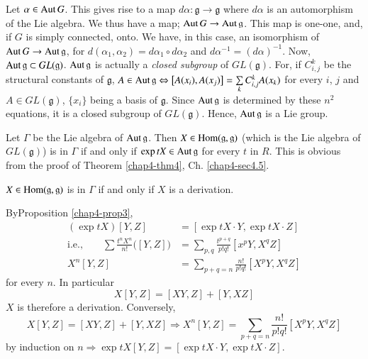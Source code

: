 Let $\alpha \in \operatorname{Aut} G$. This gives rise to a map $d \alpha:
\mathfrak{g} \rightarrow  \mathfrak{g}$ where $d \alpha$ is an
automorphism of the Lie algebra.  We thus have a map;  
 $\operatorname{Aut} G \rightarrow \operatorname{Aut} \mathfrak{g}$.  This map is one-one, and, if $G$
 is simply connected, onto. We have, in this case, an isomorphism of
 $\operatorname{Aut} G \rightarrow \operatorname{Aut} \mathfrak{g}$, for $d(\alpha_1, \alpha_2)=
 d \alpha _1 \circ d \alpha _2$ and  $d \alpha^{-1}
 =(d\alpha)^{-1}$. Now, $\operatorname{Aut}  \mathfrak{g}  \subset GL(\mathfrak{g}
 )$. $\operatorname{Aut}  \mathfrak{g}$  is actually a \textit{closed subgroup} of
 $GL(\mathfrak{g})$.  For, if $C^{k}_{i,j}$ be the structural
 constants of  $\mathfrak{g}$, 
 $A \in \operatorname{Aut} \mathfrak{g} \Leftrightarrow \big[A(x_i),
   A(x_j)\big] = \sum\limits_{k}  C^{k}_{i,j}A(x_k)$  for    every
 $i$, $j$ and $A \in GL(\mathfrak{g})$, $\{x_i\}$  being a basis of 
$\mathfrak{g}$. Since $\operatorname{Aut} \mathfrak{g}$ is determined  by these 
$n^2$ equations, it  is a closed subgroup of $GL( \mathfrak{g})$.
Hence, $\operatorname{Aut}  \mathfrak{g}$  is a Lie group. 

\begin{proposition}\label{chap4-prop3}%
 Let $ \Gamma$ be the Lie algebra of $\operatorname{Aut} \mathfrak{g}$.  Then $X \in
 \operatorname{Hom} ( \mathfrak{g},   \mathfrak{g})$ (which is the Lie algebra of 
 $GL(\mathfrak{g} )$) is in $\Gamma$ if and only if $\exp tX  \in
 \operatorname{Aut}  \mathfrak{g}$ for every $t$ in $R$. This is obvious from the
 proof of Theorem \ref{chap4-thm4}, Ch. \ref{chap4-sec4.5}. 
\end{proposition}

\begin{proposition}\label{chap4-prop4}%
$X  \in \operatorname{Hom} (\mathfrak{g}, \mathfrak{g})$ is in $\Gamma$ if and
  only if $X$ is a derivation. 
\end{proposition}

By\pageoriginale Proposition \ref{chap4-prop3}, 
\begin{align*}
(\exp tX) [Y,Z] & =[\exp tX\cdot Y,\exp 
  tX\cdot Z]\\ 
\text{i.e.,} \qquad \sum \frac{t^n X^n}{n!}\big([Y,Z]\big) &=
\sum\limits_{p,q}\frac{t^{p+q}}{p!q!}[x^pY,X^qZ]\\ 
X^n [Y,Z]&= \sum\limits_{p+q=n}\frac{n!}{p!q!}[X^pY, X^qZ]
\end{align*}
for every $n$. In particular
$$
X[Y,Z] =[XY,Z]+[Y,XZ]
$$
$X$ is therefore a derivation. Conversely,
$$
X[Y,Z]=[XY,Z]+[Y,XZ] \Rightarrow X^n [Y,Z]= \sum_{p+q=n}
\frac{n!}{p!q!} [X^pY,X^qZ]  
$$
by induction  on  $n \Rightarrow \exp  tX [Y,Z]= [\exp tX\cdot Y,
  \exp  tX\cdot Z]$. 

